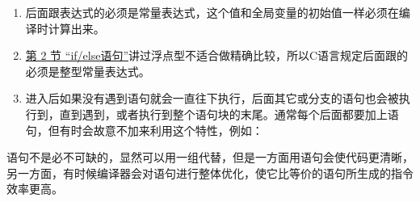 \begin{enumerate}

\item {}后面跟表达式的必须是常量表达式，这个值和全局变量的初始值一样必须在编译时计算出来。

\item \hyperlink{db.ch04s02.id2718511}{第 2 节 “if/\BookSplit{}else语句”}讲过浮点型不适合做精确比较，所以C语言规定后面跟的必须是整型常量表达式。

\item 进入后如果没有遇到语句就会一直往下执行，后面其它或分支的语句也会被执行到，直到遇到，或者执行到整个语句块的末尾。通常每个后面都要加上语句，但有时会故意不加来利用这个特性，例如：


\begin{BookExampleGraphic}
\end{BookExampleGraphic}
\end{enumerate}


语句不是必不可缺的，显然可以用一组代替，但是一方面用语句会使代码更清晰，另一方面，有时候编译器会对语句进行整体优化，使它比等价的语句所生成的指令效率更高。

